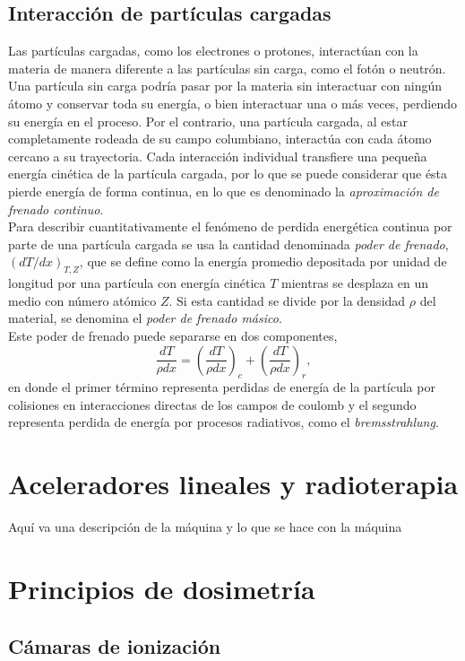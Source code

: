 \subsection{Interacción de partículas cargadas}

Las partículas cargadas, como los electrones o protones, interactúan con la materia de manera diferente a las partículas sin carga, como el fotón o neutrón. Una partícula sin carga podría pasar por la materia sin interactuar con ningún átomo y conservar toda su energía, o bien interactuar una o más veces, perdiendo su energía en el proceso. Por el contrario, una partícula cargada, al estar completamente rodeada de su campo columbiano, interactúa con cada átomo cercano a su trayectoria. Cada interacción individual transfiere una pequeña energía cinética de la partícula cargada, por lo que se puede considerar que ésta pierde energía de forma continua, en lo que es denominado la \textit{aproximación de frenado continuo}.\\

Para describir cuantitativamente el fenómeno de perdida energética continua por parte de una partícula cargada se usa la cantidad denominada \textit{poder de frenado}, $(dT/dx)_{T,Z}$, que se define como la energía promedio depositada por unidad de longitud por una partícula con energía cinética $T$ mientras se desplaza en un medio con número atómico $Z$. Si esta cantidad se divide por la densidad $\rho$ del material, se denomina el \textit{poder de frenado másico}.\\

Este poder de frenado puede separarse en dos componentes, 
\begin{equation}
	\frac{dT}{\rho dx}=\left(\frac{dT}{\rho dx}\right)_c+\left(\frac{dT}{\rho dx}\right)_r,
\end{equation}   
en donde el primer término representa perdidas de energía de la partícula por colisiones en interacciones directas de los campos de coulomb y el segundo representa perdida de energía por procesos radiativos, como el \textit{bremsstrahlung}.
\section{Aceleradores lineales y radioterapia}
Aquí va una descripción de la máquina y lo que se hace con la máquina
\section{Principios de dosimetría}
\subsection{Cámaras de ionización}
